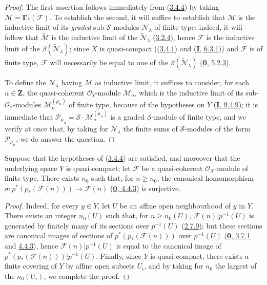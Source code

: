 \begin{proof}
The first assertion follows immediately from
(\hyperref[II.3.4.4]{3.4.4}) by taking
$\mathcal{M}=\mathbf{\Gamma}_*(\mathcal{F})$. To establish the second, it will suffice
to establish that $\mathcal{M}$ is the inductive limit of its \emph{graded}
sub-$\mathcal{S}$-modules $\mathcal{N}_\lambda$ of finite type: indeed, it
will follow that $\widetilde{\mathcal{M}}$ is the inductive limit of the
$\widetilde{\mathcal{N}}_\lambda$
(\hyperref[II.3.2.4]{3.2.4}), hence $\mathcal{F}$ is the inductive limit of
the $\beta(\widetilde{\mathcal{N}}_\lambda)$; since $X$ is quasi-compact
((\hyperref[II.3.4.1]{3.4.1}) and
(\hyperref[I.6.3.1]{\textbf{I}, 6.3.1})) and $\mathcal{F}$ is of finite type,
$\mathcal{F}$ will necessarily be equal to one of the
$\beta(\widetilde{\mathcal{N}}_\lambda)$
(\hyperref[0.5.2.3]{\textbf{0}, 5.2.3}).

To define the $\mathcal{N}_\lambda$ having $\mathcal{M}$ as inductive limit,
it suffices to consider, for each $n\in\mathbf{Z}$, the quasi-coherent
$\mathcal{O}_Y$-module $\mathcal{M}_n$, which is the inductive limit of its
sub-$\mathcal{O}_Y$-modules $\mathcal{M}_n^{(\mu_n)}$ of finite type, because
of the hypotheses on $Y$
(\hyperref[I.9.4.9]{\textbf{I}, 9.4.9}); it is immediate that
$\mathcal{P}_{\mu_n}=\mathcal{S}\cdot\mathcal{M}_n^{(\mu_n)}$ is a
graded $\mathcal{S}$-module of finite type, and we verify at once that, by
taking for $\mathcal{N}_\lambda$ the finite sums of $\mathcal{S}$-modules of
the form $\mathcal{P}_{\mu_n}$, we do answer the question.
\end{proof}

\begin{corollary}[3.4.6]
\label{II.3.4.6}
Suppose that the hypotheses of \textup{(\hyperref[II.3.4.4]{3.4.4})} are
satisfied, and moreover that the underlying space $Y$ is quasi-compact; let
$\mathcal{F}$ be a quasi-coherent $\mathcal{O}_X$-module of finite type. There
exists $n_0$ such that, for $n\geq n_0$, the canonical homomorphism
$\sigma:p^*(p_*(\mathcal{F}(n)))\to\mathcal{F}(n)$
\textup{(\hyperref[0.4.4.3]{\textbf{0}, 4.4.3})} is surjective.
\end{corollary}

\begin{proof}
Indeed, for every $y\in Y$, let $U$ be an affine open neighbourhood of $y$ in
$Y$. There exists an integer $n_0(U)$ such that, for $n\geq n_0(U)$,
$\mathcal{F}(n)|p^{-1}(U)$ is generated by finitely many of its sections
over $p^{-1}(U)$ (\hyperref[II.2.7.9]{2.7.9}); but these sections
are canonical images of sections of $p^*(p_*(\mathcal{F}(n)))$ over
$p^{-1}(U)$ (\hyperref[0.3.7.1]{\textbf{0}, 3.7.1} and
\hyperref[0.4.4.3]{4.4.3}), hence
$\mathcal{F}(n)|p^{-1}(U)$ is equal to the canonical image of
$p^*(p_*(\mathcal{F}(n)))|p^{-1}(U)$. Finally, since $Y$ is quasi-compact,
there exists a finite covering of $Y$ by affine open subsets $U_i$, and by
taking for $n_0$ the largest of the $n_0(U_i)$, we complete the proof.
\end{proof}

